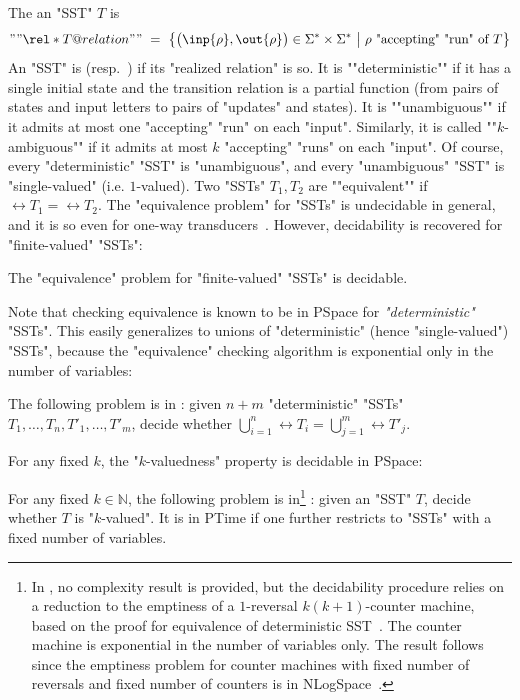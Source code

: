 \documentclass{theoretics}
\newcommand{\sst}{T}
\newcommand{\alp}{\Sigma}
\begin{document}
\AP
The  an "SST" $T$ is 
\[
  ""\rel*{T} @relation""
  ~=~ 
  \big\{ \big(\inp{\rho},\out{\rho}\big)\in \alp^*\times \alp^* ~\big|~
         \rho\text{ "accepting" "run" of }T \big\}
\]
\AP
An "SST" is  (resp.~) 
if its "realized relation" is so.
\AP
It is ""deterministic"" 
if it has a single
initial state and the transition relation is a partial function 
(from pairs of states and input letters to pairs of "updates" and states).
\AP
It is ""unambiguous"" if it admits at most one "accepting" "run" on each "input".
\AP
Similarly, it is called ""$k$-ambiguous"" if it admits at most 
$k$ "accepting" "runs" on each "input". 
Of course, every "deterministic" "SST" is "unambiguous", and every
"unambiguous" "SST" is "single-valued" (i.e. $1$-valued).
\AP
Two "SSTs" $\sst_1,\sst_2$ are ""equivalent"" 
if $\rel{\sst_1}=\rel{\sst_2}$. 
The "equivalence problem" for "SSTs" is undecidable in
general, and it is so even for one-way transducers~\cite{FischerR68,iba78siam}. 
However, decidability is recovered for "finite-valued" "SSTs":

\begin{theorem}
The "equivalence" problem for "finite-valued" "SSTs" is decidable.
\end{theorem}


Note that checking equivalence is known to be in 
{\upshape\sc PSpace} for \emph{"deterministic"} "SSTs".
This easily generalizes to 
unions of "deterministic" (hence "single-valued") "SSTs", because the
"equivalence" checking algorithm is exponential only in the number of variables: 

\begin{theorem}
The following problem is in : 
given $n+m$ "deterministic" "SSTs" $\sst_1,\dots,\sst_n,\sst'_1,\dots,\sst'_m$, 
decide whether $\bigcup_{i=1}^n\rel{\sst_i} = \bigcup_{j=1}^m\rel{\sst'_j}$.
\end{theorem}

For any fixed $k$, the "$k$-valuedness" property is 
decidable in {\upshape\sc PSpace}:

\begin{theorem}
For any fixed $k\in\mathbb{N}$, the following problem 
is in\footnote{In
  \cite{DBLP:conf/icalp/AlurD11}, no complexity result is provided,
  but the decidability procedure relies on a reduction to the
  emptiness of a $1$-reversal $k(k+1)$-counter machine, based on the
  proof for equivalence of deterministic
SST~\cite{DBLP:conf/popl/AlurC11}. The counter machine is 
exponential in the number of variables only. The result follows since the
emptiness problem for counter machines with fixed number of reversals and fixed
number of counters is in
{\upshape\sc NLogSpace}~\cite{DBLP:journals/jcss/GurariI81}.} : 
given an "SST" $T$, decide whether $T$ is "$k$-valued".
It is in {\upshape\sc PTime} if one further restricts to "SSTs"
with a fixed number of variables.
\end{theorem}
\end{document}
